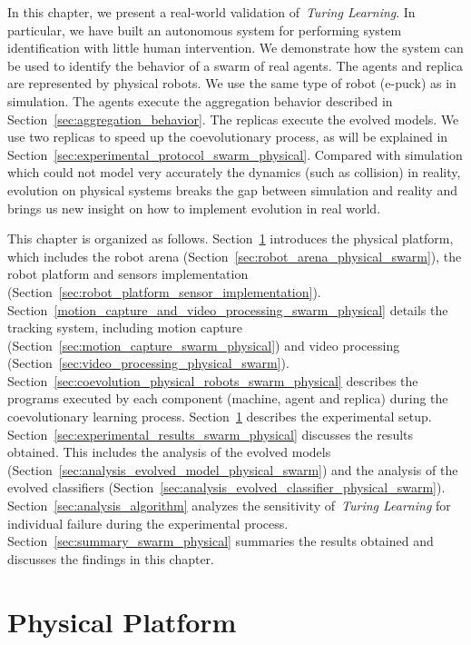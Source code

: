 In this chapter, we present a real-world validation of~\textit{Turing Learning}. In particular, we have built an autonomous system for performing system identification with little human intervention. We demonstrate how the system can be used to identify the behavior of a swarm of real agents. The agents and replica are represented by physical robots. We use the same type of robot (e-puck) as in simulation. The agents execute the aggregation behavior described in Section~\ref{sec:aggregation_behavior}. The replicas execute the evolved models. We use two replicas to speed up the coevolutionary process, as will be explained in Section~\ref{sec:experimental_protocol_swarm_physical}. Compared with simulation which  could not model very accurately the dynamics (such as collision) in reality, evolution on physical systems breaks the gap between simulation and reality and brings us new insight on how to implement evolution in real world. 

This chapter is organized as follows. Section~\ref{sec:experimental_setup_swarm_physical} introduces the physical platform, which includes the robot arena (Section~\ref{sec:robot_arena_physical_swarm}), the robot platform and sensors implementation (Section~\ref{sec:robot_platform_sensor_implementation}). Section~\ref{motion_capture_and_video_processing_swarm_physical} details the tracking system, including motion capture (Section~\ref{sec:motion_capture_swarm_physical}) and video processing (Section~\ref{sec:video_processing_physical_swarm}). Section~\ref{sec:coevolution_physical_robots_swarm_physical} describes the programs executed by each component (machine, agent and replica) during the coevolutionary learning process. Section~\ref{sec:experimental_setup_swarm_physical} describes the experimental setup. Section~\ref{sec:experimental_results_swarm_physical} discusses the results obtained. This includes the analysis of the evolved models (Section~\ref{sec:analysis_evolved_model_physical_swarm}) and the analysis of the evolved classifiers (Section~\ref{sec:analysis_evolved_classifier_physical_swarm}). Section~\ref{sec:analysis_algorithm} analyzes the sensitivity of~\textit{Turing Learning} for individual failure during the experimental process. Section~\ref{sec:summary_swarm_physical} summaries the results obtained and discusses the findings in this chapter.

\section{Physical Platform}\label{sec:experimental_setup_swarm_physical}

